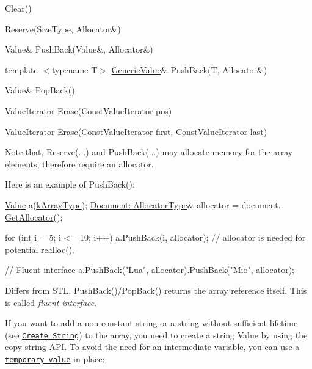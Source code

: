 \begin{DoxyItemize}
\item {\ttfamily Clear()}
\item {\ttfamily Reserve(\+Size\+Type, Allocator\&)}
\item {\ttfamily Value\& Push\+Back(\+Value\&, Allocator\&)}
\item {\ttfamily template $<$typename T$>$ \hyperlink{class_generic_value}{Generic\+Value}\& Push\+Back(\+T, Allocator\&)}
\item {\ttfamily Value\& Pop\+Back()}
\item {\ttfamily Value\+Iterator Erase(\+Const\+Value\+Iterator pos)}
\item {\ttfamily Value\+Iterator Erase(\+Const\+Value\+Iterator first, Const\+Value\+Iterator last)}
\end{DoxyItemize}

Note that, {\ttfamily Reserve(...)} and {\ttfamily Push\+Back(...)} may allocate memory for the array elements, therefore require an allocator.

Here is an example of {\ttfamily Push\+Back()}\+:


\begin{DoxyCode}
\hyperlink{class_generic_value}{Value} a(\hyperlink{rapidjson_8h_a1d1cfd8ffb84e947f82999c682b666a7af41527d6925efa3c5c3dadb23dfef7c8}{kArrayType});
\hyperlink{class_generic_document_a35155b912da66ced38d22e2551364c57}{Document::AllocatorType}& allocator = document.
      \hyperlink{class_generic_document_aa4609d6b19f86aec1a6b96edf2c27686}{GetAllocator}();

\textcolor{keywordflow}{for} (\textcolor{keywordtype}{int} i = 5; i <= 10; i++)
    a.PushBack(i, allocator);   \textcolor{comment}{// allocator is needed for potential realloc().}

\textcolor{comment}{// Fluent interface}
a.PushBack(\textcolor{stringliteral}{"Lua"}, allocator).PushBack(\textcolor{stringliteral}{"Mio"}, allocator);
\end{DoxyCode}


Differs from S\+TL, {\ttfamily Push\+Back()}/{\ttfamily Pop\+Back()} returns the array reference itself. This is called {\itshape fluent interface}.

If you want to add a non-\/constant string or a string without sufficient lifetime (see \href{#CreateString}{\tt Create String}) to the array, you need to create a string Value by using the copy-\/string A\+PI. To avoid the need for an intermediate variable, you can use a \href{#TemporaryValues}{\tt temporary value} in place\+:


